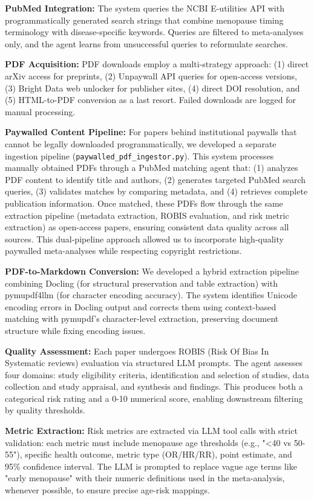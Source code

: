 \documentclass[12pt]{article}
\begin{document}
\textbf{PubMed Integration:} The system queries the NCBI E-utilities API with programmatically generated search strings that combine menopause timing terminology with disease-specific keywords. Queries are filtered to meta-analyses only, and the agent learns from unsuccessful queries to reformulate searches.

\textbf{PDF Acquisition:} PDF downloads employ a multi-strategy approach: (1) direct arXiv access for preprints, (2) Unpaywall API queries for open-access versions, (3) Bright Data web unlocker for publisher sites, (4) direct DOI resolution, and (5) HTML-to-PDF conversion as a last resort. Failed downloads are logged for manual processing.

\textbf{Paywalled Content Pipeline:} For papers behind institutional paywalls that cannot be legally downloaded programmatically, we developed a separate ingestion pipeline (\texttt{paywalled\_pdf\_ingestor.py}). This system processes manually obtained PDFs through a PubMed matching agent that: (1) analyzes PDF content to identify title and authors, (2) generates targeted PubMed search queries, (3) validates matches by comparing metadata, and (4) retrieves complete publication information. Once matched, these PDFs flow through the same extraction pipeline (metadata extraction, ROBIS evaluation, and risk metric extraction) as open-access papers, ensuring consistent data quality across all sources. This dual-pipeline approach allowed us to incorporate high-quality paywalled meta-analyses while respecting copyright restrictions.

\textbf{PDF-to-Markdown Conversion:} We developed a hybrid extraction pipeline combining Docling (for structural preservation and table extraction) with pymupdf4llm (for character encoding accuracy). The system identifies Unicode encoding errors in Docling output and corrects them using context-based matching with pymupdf's character-level extraction, preserving document structure while fixing encoding issues.

\textbf{Quality Assessment:} Each paper undergoes ROBIS (Risk Of Bias In Systematic reviews) evaluation \parencite{whitingROBISNewTool2016} via structured LLM prompts. The agent assesses four domains: study eligibility criteria, identification and selection of studies, data collection and study appraisal, and synthesis and findings. This produces both a categorical risk rating and a 0-10 numerical score, enabling downstream filtering by quality thresholds.

\textbf{Metric Extraction:} Risk metrics are extracted via LLM tool calls with strict validation: each metric must include menopause age thresholds (e.g., "<40 vs 50-55"), specific health outcome, metric type (OR/HR/RR), point estimate, and 95\% confidence interval. The LLM is prompted to replace vague age terms like "early menopause" with their numeric definitions used in the meta-analysis, whenever possible, to ensure precise age-risk mappings.
\end{document}
